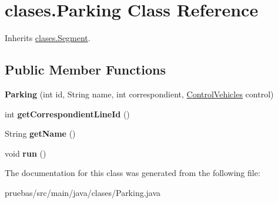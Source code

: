 \hypertarget{classclases_1_1_parking}{}\section{clases.\+Parking Class Reference}
\label{classclases_1_1_parking}


Inherits \mbox{\hyperlink{classclases_1_1_segment}{clases.\+Segment}}.

\subsection*{Public Member Functions}
\begin{DoxyCompactItemize}
\item 
\mbox{\label{classclases_1_1_parking_aed5b077a48389218d8cb53cd7e23d075}} 
{\bfseries Parking} (int id, String name, int correspondient, \mbox{\hyperlink{classcontrol_1_1_control_vehicles}{Control\+Vehicles}} control)
\item 
\mbox{\label{classclases_1_1_parking_a03f52670aae58fe1af947e75cc8ca318}} 
int {\bfseries get\+Correspondient\+Line\+Id} ()
\item 
\mbox{\label{classclases_1_1_parking_adcdc236dec3311a9830a411a3cbbc448}} 
String {\bfseries get\+Name} ()
\item 
\mbox{\label{classclases_1_1_parking_a6caa7f58e50c46346ae1233f1988c84d}} 
void {\bfseries run} ()
\end{DoxyCompactItemize}


The documentation for this class was generated from the following file\+:\begin{DoxyCompactItemize}
\item 
pruebas/src/main/java/clases/Parking.\+java\end{DoxyCompactItemize}

